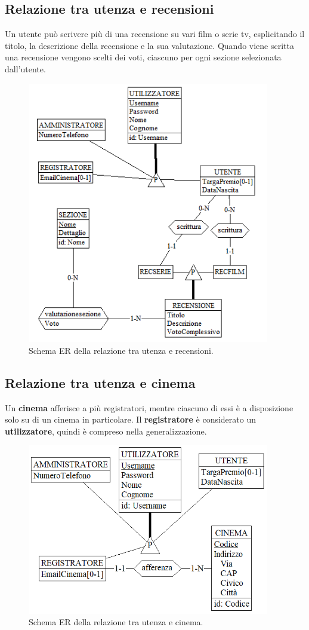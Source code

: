 \documentclass[a4paper,12pt]{report}
\begin{document}
\subsection{Relazione tra utenza e recensioni}
Un utente può scrivere più di una recensione su vari film o serie tv, esplicitando il titolo, la descrizione della recensione e la sua valutazione. Quando viene scritta una recensione vengono scelti dei voti, ciascuno per ogni sezione selezionata dall'utente.
\begin{figure}[H]
	\centering
	\includegraphics[width=300pt]{ER/utenzarecensione.png}
	\caption{Schema ER della relazione tra utenza e recensioni.}
\end{figure}
\subsection{Relazione tra utenza e cinema}
Un \textbf{cinema} afferisce a più registratori, mentre ciascuno di essi è a disposizione solo su di un cinema in particolare. Il \textbf{registratore} è considerato un \textbf{utilizzatore}, quindi è compreso nella generalizzazione.
\begin{figure}[H]
	\centering
	\includegraphics[width=300pt]{ER/utenzacinema.png}
	\caption{Schema ER della relazione tra utenza e cinema.}
\end{figure}
\end{document}

